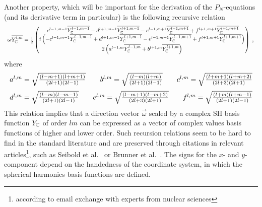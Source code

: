 Another property, which will be important for the derivation of the $P_N$-equations (and its derivative term in particular) is the following recursive relation
\begin{equation}
\label{eq:recursive_relation}
\resizebox{1.0\hsize}{!}{$\vec{\omega}\overline{\SHBC^{l,m}} = \frac{1}{2}
\begin{pmatrix}
\ c^{l-1, m-1}\overline{\SHBC^{l-1,m-1}} - d^{l+1, m-1}\overline{\SHBC^{l+1,m-1}} - e^{l-1, m+1}\overline{\SHBC^{l-1,m+1}} + f^{l+1, m+1}\overline{\SHBC^{l+1,m+1}}\\
i\left(-c^{l-1, m-1}\overline{\SHBC^{l-1,m-1}} + d^{l+1, m-1}\overline{\SHBC^{l+1,m-1}} - e^{l-1, m+1}\overline{\SHBC^{l-1,m+1}} + f^{l+1, m+1}\overline{\SHBC^{l+1,m+1}}\right) \\
2\left(a^{l-1, m}\overline{\SHBC^{l-1,m}}+b^{l+1, m}\overline{\SHBC^{l+1,m}}\right)
\end{pmatrix}$}
\ ,
\end{equation}
where
\begin{equation*}
\resizebox{1.0\hsize}{!}{$
a^{l,m}= \sqrt{\frac{\left(l-m+1\right)\left(l+m+1\right)}{\left(2l+1\right)\left(2l-1\right)}} \qquad
b^{l,m}= \sqrt{\frac{\left(l-m\right)\left(l+m\right)}{\left(2l+1\right)\left(2l-1\right)}} \qquad
c^{l,m}= \sqrt{\frac{\left(l+m+1\right)\left(l+m+2\right)}{\left(2l+3\right)\left(2l+1\right)}}
$}
\end{equation*}
\begin{equation*}
\resizebox{1.0\hsize}{!}{$
d^{l,m}= \sqrt{\frac{\left(l-m\right)\left(l-m-1\right)}{\left(2l+1\right)\left(2l-1\right)}} \qquad
e^{l,m}= \sqrt{\frac{\left(l-m+1\right)\left(l-m+2\right)}{\left(2l+3\right)\left(2l+1\right)}} \qquad
f^{l,m}= \sqrt{\frac{\left(l+m\right)\left(l+m-1\right)}{\left(2l+1\right)\left(2l-1\right)}}
$}
\end{equation*}
This relation implies that a direction vector $\vec{\omega}$ scaled by a complex SH basis function $Y_{\mathbb{C}}$ of order $lm$ can be expressed as a vector of complex values basis functions of higher and lower order. Such recursion relations seem to be hard to find in the standard literature and are preserved through citations in relevant articles\footnote{according to email exchange with experts from nuclear sciences}, such as Seibold et al.~\cite{Seibold14} or Brunner et al.~\cite{Brunner05}. The signs for the $x$- and $y$- component depend on the handedness of the coordinate system, in which the spherical harmonics basis functions are defined.